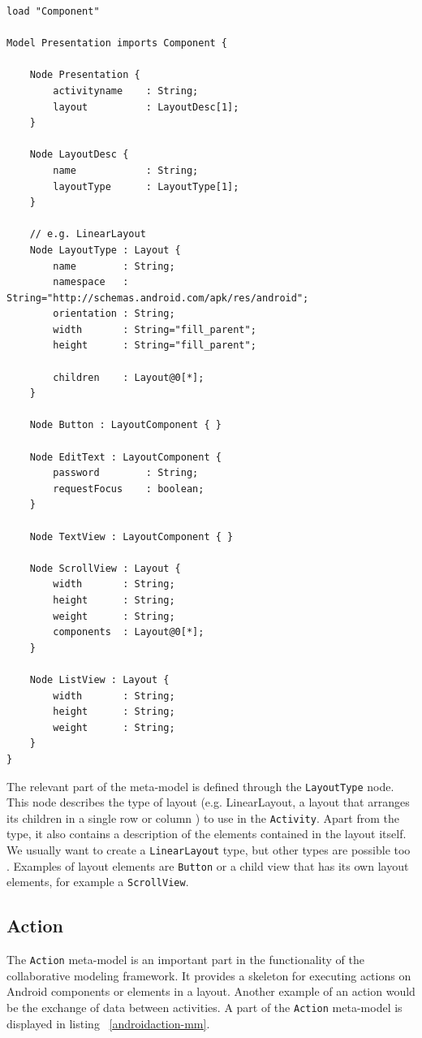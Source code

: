 \begin{lstlisting}[label=presentation-mm,caption=Presentation meta-model, captionpos=t]
load "Component"

Model Presentation imports Component {
	
	Node Presentation {
		activityname 	: String;
		layout 			: LayoutDesc[1];
	}

	Node LayoutDesc {
		name			: String;
		layoutType		: LayoutType[1];
	}

	// e.g. LinearLayout
	Node LayoutType : Layout {
		name 		: String;
		namespace	: String="http://schemas.android.com/apk/res/android";
		orientation	: String;
		width		: String="fill_parent";
		height		: String="fill_parent";

		children 	: Layout@0[*];
	}

	Node Button : LayoutComponent { }

	Node EditText : LayoutComponent {
		password 		: String;
		requestFocus	: boolean;
	}

	Node TextView : LayoutComponent { }

	Node ScrollView : Layout {
		width 		: String;
		height 		: String;
		weight 		: String;
		components 	: Layout@0[*];
	}

	Node ListView : Layout {
		width		: String;
		height		: String;
		weight		: String;
	}
}
\end{lstlisting}
The relevant part of the meta-model is defined through the \texttt{LayoutType} node. This node describes the type of layout (e.g. LinearLayout, a layout that arranges its children in a single row or column \cite{AndroidLinearLayout}) to use in the \texttt{Activity}. Apart from the type, it also contains a description of the elements contained in the layout itself. We usually want to create a \texttt{LinearLayout} type, but other types are possible too \cite{AndroidLayoutType}. Examples of layout elements are \texttt{Button} or a child view that has its own layout elements, for example a \texttt{ScrollView}.

\subsection{Action}

The \texttt{Action} meta-model is an important part in the functionality of the collaborative modeling framework. It provides a skeleton for executing actions on Android components or elements in a layout. Another example of an action would be the exchange of data between activities. A part of the \texttt{Action} meta-model is displayed in listing ~\ref{androidaction-mm}.

